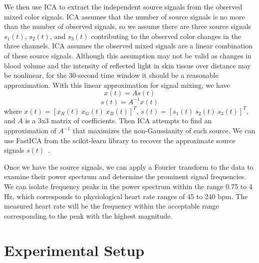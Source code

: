 \documentclass[10pt,twocolumn,letterpaper]{article}
\begin{document}
We then use ICA to extract the independent source signals from the observed mixed color signals. ICA assumes that the number of source signals is no more than the number of observed signals, so we assume there are three source signals $s_1(t)$, $s_2(t)$, and $s_3(t)$ contributing to the observed color changes in the three channels. ICA assumes the observed mixed signals are a linear combination of these source signals. Although this assumption may not be valid as changes in blood volume and the intensity of reflected light in skin tissue over distance may be nonlinear, for the 30-second time window it should be a reasonable approximation. With this linear approximation for signal mixing, we have 
	$$x(t) = As(t)$$ 
	$$s(t) = A^{-1}x(t)$$
where $x(t) = [x_R(t)\ x_G(t)\ x_B(t)]^T$, $s(t) = [s_1(t)\ s_2(t)\ s_3(t)]^T$, and $A$ is a 3x3 matrix of coefficients. Then ICA attempts to find an approximation of $A^{-1}$ that maximizes the non-Gaussianity of each source. We can use FastICA from the scikit-learn library to recover the approximate source signals $s(t)$~\cite{scikit-learn}.

Once we have the source signals, we can apply a Fourier transform to the data to examine their power spectrum and determine the prominent signal frequencies. We can isolate frequency peaks in the power spectrum within the range 0.75 to 4 Hz, which corresponds to physiological heart rate ranges of 45 to 240 bpm. The measured heart rate will be the frequency within the acceptable range corresponding to the peak with the highest magnitude.

\section{Experimental Setup} \label{exp_setup}
\end{document}
